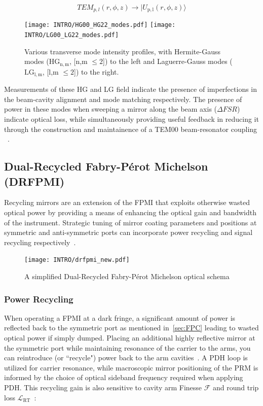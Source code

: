 $$TEM_{p,l}(r,\phi,z) \rightarrow | U_\mathrm{p,l}(r,\phi,z)\rangle$$


\begin{figure}[h!]
  \begin{subcaptiongroup}
	  \texttt{[image: INTRO/HG00\_HG22\_modes.pdf]}
	  \hspace{3.5mm}
	  \texttt{[image: INTRO/LG00\_LG22\_modes.pdf]}
  \end{subcaptiongroup}
  \hfill
  \caption{Various transverse mode intensity profiles, with Hermite-Gauss modes ($\mathrm{HG}_\mathrm{n,m}$, [n,m \hspace{.01pt} $\leq 2$]) to the left and Laguerre-Gauss modes ($\mathrm{LG}_\mathrm{l,m}$,  [l,m \hspace{.01pt} $\leq 2$]) to the right.}
  \label{fig:HGLG_modes}
\end{figure}

\newpage 
Measurements of these HG and LG field indicate the presence of imperfections in the beam-cavity alignment and mode matching respectively. The presence of power in these modes when sweeping a mirror along the beam axis ($\Delta FSR$) indicate optical loss, while simultaneously providing useful feedback in reducing it through the construction and maintainence of a TEM00 beam-resonator coupling ~\cite{anderson:1984}. 

\subsection{Dual-Recycled Fabry-P\'erot Michelson (DRFPMI)}
Recycling mirrors are an extension of the FPMI that exploits otherwise wasted optical power by providing a means of enhancing the optical gain and bandwidth of the instrument. Strategic tuning of mirror coating parameters and positions at symmetric and anti-symmetric ports can incorporate power recycling and signal recycling respectively~\cite{meers:1988}.

\begin{figure}[ht!]
\begin{center}
\texttt{[image: INTRO/drfpmi\_new.pdf]}
\end{center}
\caption{A simplified Dual-Recycled Fabry-P\'erot Michelson optical schema}
\label{fig:drfp_michelson}
\end{figure}

\subsubsection{Power Recycling}
When operating a FPMI at a dark fringe, a significant amount of power is reflected back to the symmetric port as mentioned in~\autoref{sec:FPC} leading to wasted optical power if simply dumped. Placing an additional highly reflective mirror at the symmetric port while maintaining resonance of the carrier to the arms, you can reintroduce (or ``recycle") power back to the arm cavities~\cite{abbott:2009}. A PDH loop is utilized for carrier resonance, while macroscopic mirror positioning of the PRM is informed by the choice of optical sideband frequency required when applying PDH. This recycling gain is also sensitive to cavity arm Finesse $\mathscr{F}$ and round trip loss $\mathscr{L}_\mathrm{RT}$~\cite{Vajente:2018_unpub}: 

